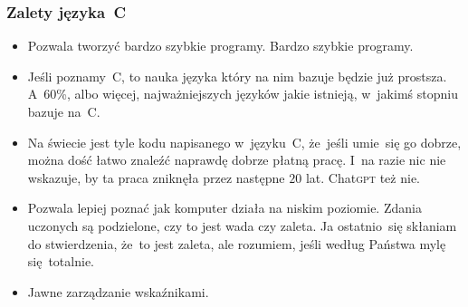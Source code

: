 \documentclass[10pt,t]{beamer}
\begin{document}
\begin{frame}
  \frametitle{Zalety języka~C}


  \begin{itemize}

  \item Pozwala tworzyć bardzo szybkie programy. \alert{Bardzo szybkie}
      programy.

  \item Jeśli poznamy~C, to nauka języka który na nim bazuje będzie
    już prostsza. A~60\%, albo więcej, najważniejszych języków jakie
    istnieją, w~jakimś stopniu bazuje na~C.

  \item Na świecie jest tyle kodu napisanego w~języku~C, że~jeśli umie~się
    go dobrze, można dość łatwo znaleźć naprawdę dobrze płatną pracę. I~na
    razie nic nie wskazuje, by ta praca zniknęła przez następne $20$ lat.
    Chat\textsc{gpt} też nie.

  \item Pozwala lepiej poznać jak komputer działa na niskim poziomie.
    Zdania uczonych są podzielone, czy to jest wada czy zaleta. Ja
    ostatnio~się skłaniam do stwierdzenia, że~to jest zaleta, ale rozumiem,
    jeśli według Państwa mylę się~totalnie.

  \item Jawne zarządzanie wskaźnikami.

  \end{itemize}

\end{frame}
\end{document}
